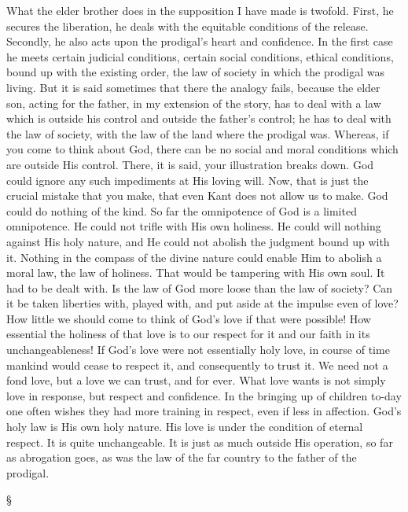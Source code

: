 \documentclass[12pt,letterpaper,oneside]{book}
\begin{document}
What the elder brother does in the supposition
I have made is twofold. First, he secures 
the liberation, he deals with the equitable conditions 
of the release. Secondly, he also acts upon 
the prodigal's heart and confidence. In the first 
case he meets certain judicial conditions, certain 
social conditions, ethical conditions, bound 
up with the existing order, the law of society 
in which the prodigal was living. But it is 
said sometimes that there the analogy fails, 
because the elder son, acting for the father, 
in my extension of the story, has to deal with 
a law which is outside his control and outside 
the father's control; he has to deal with the 
law of society, with the law of the land where 
the prodigal was. Whereas, if you come to 
think about God, there can be no social and 
moral conditions which are outside His control. 
There, it is said, your illustration breaks down. 
God could ignore any such impediments at 
His loving will. Now, that is just the crucial 
mistake that you make, that even Kant does 
not allow us to make. God could do nothing 
of the kind. So far the omnipotence of God is 
a limited omnipotence. He could not trifle with 
His own holiness. He could will nothing against 
His holy nature, and He could not abolish the 
judgment bound up with it. Nothing in the 
compass of the divine nature could enable Him 
to abolish a moral law, the law of holiness. That 
would be tampering with His own soul. It had 
to be dealt with. Is the law of God more loose 
than the law of society? Can it be taken liberties 
with, played with, and put aside at the 
impulse even of love? How little we should 
come to think of God's love if that were possible! 
How essential the holiness of that love is to 
our respect for it and our faith in its unchangeableness! 
If God's love were not essentially 
holy love, in course of time mankind would 
cease to respect it, and consequently to trust 
it. We need not a fond love, but a love we 
can trust, and for ever. What love wants is not 
simply love in response, but respect and confidence. 
In the bringing up of children to-day 
one often wishes they had more training in 
respect, even if less in affection. God's holy 
law is His own holy nature. His love is under 
the condition of eternal respect. It is quite 
unchangeable. It is just as much outside His 
operation, so far as abrogation goes, as was 
the law of the far country to the father of 
the prodigal. 

\begin{center}
\S
\end{center}
\end{document}
